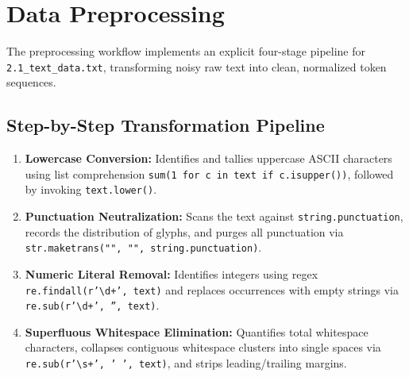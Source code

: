 \documentclass[12pt,a4paper]{report}
\begin{document}
\section{Data Preprocessing}
The preprocessing workflow implements an explicit four-stage pipeline for \texttt{2.1\_text\_data.txt}, transforming noisy raw text into clean, normalized token sequences.

\subsection{Step-by-Step Transformation Pipeline}
\begin{enumerate}
    \item \textbf{Lowercase Conversion:} Identifies and tallies uppercase ASCII characters using list comprehension \texttt{sum(1 for c in text if c.isupper())}, followed by invoking \texttt{text.lower()}.
    \item \textbf{Punctuation Neutralization:} Scans the text against \texttt{string.punctuation}, records the distribution of glyphs, and purges all punctuation via \texttt{str.maketrans("", "", string.punctuation)}.
    \item \textbf{Numeric Literal Removal:} Identifies integers using regex \texttt{re.findall(r'\textbackslash d+', text)} and replaces occurrences with empty strings via \texttt{re.sub(r'\textbackslash d+', '', text)}.
    \item \textbf{Superfluous Whitespace Elimination:} Quantifies total whitespace characters, collapses contiguous whitespace clusters into single spaces via \texttt{re.sub(r'\textbackslash s+', ' ', text)}, and strips leading/trailing margins.
\end{enumerate}
\end{document}
